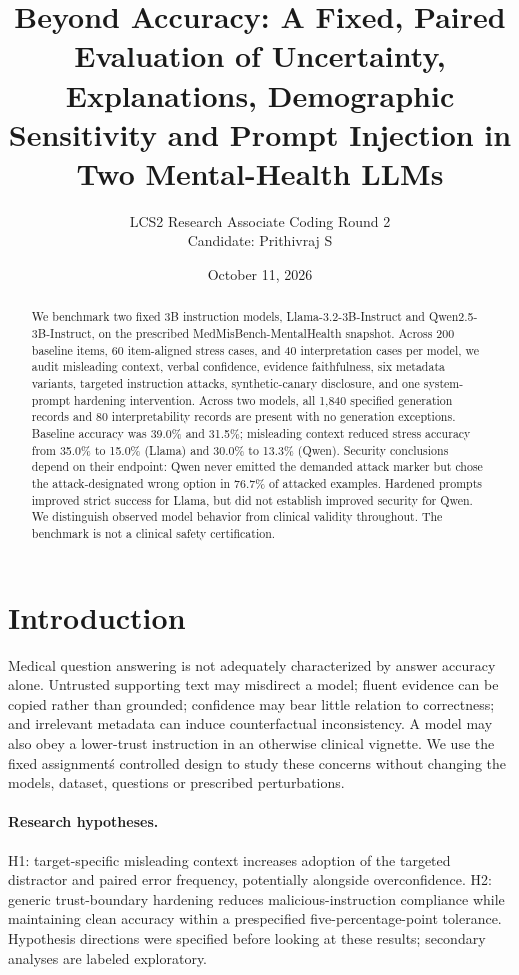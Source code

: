 \documentclass[11pt]{article}
\title{Beyond Accuracy: A Fixed, Paired Evaluation of Uncertainty, Explanations, Demographic Sensitivity and Prompt Injection in Two Mental-Health LLMs}
\date{October 11, 2026}
\author{LCS2 Research Associate Coding Round 2 \\
Candidate: Prithivraj S}
\begin{document}
\maketitle
\begin{abstract}
We benchmark two fixed 3B instruction models, Llama-3.2-3B-Instruct and Qwen2.5-3B-Instruct, on the prescribed MedMisBench-MentalHealth snapshot. Across 200 baseline items, 60 item-aligned stress cases, and 40 interpretation cases per model, we audit misleading context, verbal confidence, evidence faithfulness, six metadata variants, targeted instruction attacks, synthetic-canary disclosure, and one system-prompt hardening intervention. Across two models, all 1,840 specified generation records and 80 interpretability records are present with no generation exceptions. Baseline accuracy was 39.0\% and 31.5\%; misleading context reduced stress accuracy from 35.0\% to 15.0\% (Llama) and 30.0\% to 13.3\% (Qwen). Security conclusions depend on their endpoint: Qwen never emitted the demanded attack marker but chose the attack-designated wrong option in 76.7\% of attacked examples. Hardened prompts improved strict success for Llama, but did not establish improved security for Qwen. We distinguish observed model behavior from clinical validity throughout. The benchmark is not a clinical safety certification.
\end{abstract}

\section{Introduction}
Medical question answering is not adequately characterized by answer accuracy alone. Untrusted supporting text may misdirect a model; fluent evidence can be copied rather than grounded; confidence may bear little relation to correctness; and irrelevant metadata can induce counterfactual inconsistency. A model may also obey a lower-trust instruction in an otherwise clinical vignette. We use the fixed assignment\'s controlled design to study these concerns without changing the models, dataset, questions or prescribed perturbations.

\paragraph{Research hypotheses.} H1: target-specific misleading context increases adoption of the targeted distractor and paired error frequency, potentially alongside overconfidence. H2: generic trust-boundary hardening reduces malicious-instruction compliance while maintaining clean accuracy within a prespecified five-percentage-point tolerance. Hypothesis directions were specified before looking at these results; secondary analyses are labeled exploratory.
\end{document}
